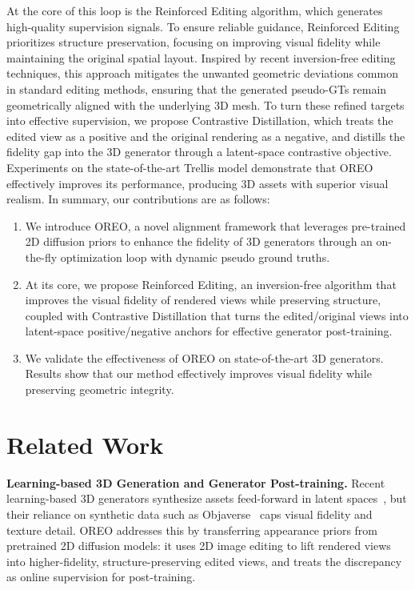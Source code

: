 \documentclass[runningheads]{llncs}
\begin{document}
At the core of this loop is the Reinforced Editing algorithm, which generates high-quality supervision signals.
To ensure reliable guidance, Reinforced Editing prioritizes structure preservation, focusing on improving visual fidelity while maintaining the original spatial layout.
Inspired by recent inversion-free editing techniques, this approach mitigates the unwanted geometric deviations common in standard editing methods, ensuring that the generated pseudo-GTs remain geometrically aligned with the underlying 3D mesh.
To turn these refined targets into effective supervision, we propose Contrastive Distillation, which treats the edited view as a positive and the original rendering as a negative, and distills the fidelity gap into the 3D generator through a latent-space contrastive objective.
Experiments on the state-of-the-art Trellis model demonstrate that OREO effectively improves its performance, producing 3D assets with superior visual realism.
In summary, our contributions are as follows:
\begin{enumerate}\setlength{\itemsep}{0pt}
    \item We introduce OREO, a novel alignment framework that leverages pre-trained 2D diffusion priors to enhance the fidelity of 3D generators through an on-the-fly optimization loop with dynamic pseudo ground truths.
    \item At its core, we propose Reinforced Editing, an inversion-free algorithm that improves the visual fidelity of rendered views while preserving structure, coupled with Contrastive Distillation that turns the edited/original views into latent-space positive/negative anchors for effective generator post-training.
    \item We validate the effectiveness of OREO on state-of-the-art 3D generators. Results show that our method effectively improves visual fidelity while preserving geometric integrity.
\end{enumerate}

\section{Related Work}
\label{sec:related_work}

\noindent\textbf{Learning-based 3D Generation and Generator Post-training.}
Recent learning-based 3D generators synthesize assets feed-forward in latent spaces~\cite{xiang2025structured,zhao2025hunyuan3d,ye2025hi3dgen,li2025triposg,guo2025hyper3d,yushi2025gaussiananything,chen20253dtopia,lin2025diffsplat,li2025step1x,zhang2025bang,yang20264dvd,yang2026gencompositor,liang2026aligncvc,wang2026one2scene,liu2025mvboost}, but their reliance on synthetic data such as Objaverse~\cite{deitke2023objaverse} caps visual fidelity and texture detail.
OREO addresses this by transferring appearance priors from pretrained 2D diffusion models: it uses 2D image editing to lift rendered views into higher-fidelity, structure-preserving edited views, and treats the discrepancy as online supervision for post-training.
\end{document}

